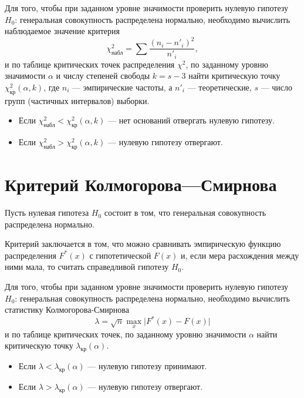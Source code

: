 Для того, чтобы при заданном уровне значимости проверить нулевую гипотезу $H_0$: генеральная совокупность распределена нормально, 
необходимо вычислить наблюдаемое значение критерия
\begin{equation*}
	\chi_{\textrm{набл}}^2 = \sum{\frac{(n_i-n'_i)^2}{n'_i}},
\end{equation*}
и по таблице критических точек распределения $\chi^2$, по заданному уровню значимости $\alpha$ и числу степеней свободы $k = s-3$ найти критическую точку $\chi_{\textrm{кр}}^2(\alpha, k)$, где $n_i$ --- эмпирические частоты, а $n'_i$ --- теоретические, $s$ --- число групп (частичных интервалов) выборки.
\begin{itemize}
	\item Если $\chi_{\textrm{набл}}^2 < \chi_{\textrm{кр}}^2(\alpha, k)$ --- нет оснований отвергать нулевую гипотезу.
	\item Если $\chi_{\textrm{набл}}^2 > \chi_{\textrm{кр}}^2(\alpha, k)$ --- нулевую гипотезу отвергают.
\end{itemize}


\section*{Критерий Колмогорова---Смирнова} %
\label{sec:kolm_smirn}

Пусть нулевая гипотеза $H_0$ состоит в том, что генеральная совокупность распределена нормально.

Критерий заключается в том, что можно сравнивать эмпирическую функцию распределения $F^{*}(x)$ с гипотетической $F(x)$ и, если мера 
расхождения между ними мала, то считать справедливой гипотезу $H_0$.

Для того, чтобы при заданном уровне значимости проверить нулевую гипотезу $H_0$: генеральная совокупность распределена нормально, 
необходимо вычислить статистику Колмогорова-Смирнова 
\begin{equation*}
	\lambda = \sqrt{n}\max_{x} \vert F^{*}(x) - F(x) \vert 
\end{equation*}
и по таблице критических точек, по заданному уровню значимости $\alpha$ найти критическую точку $\lambda_{\textrm{кр}}(\alpha)$.
\begin{itemize}
	\item Если $\lambda < \lambda_{\textrm{кр}}(\alpha)$ --- нулевую гипотезу принимают.
	\item Если $\lambda > \lambda_{\textrm{кр}}(\alpha)$ --- нулевую гипотезу отвергают.
\end{itemize}

